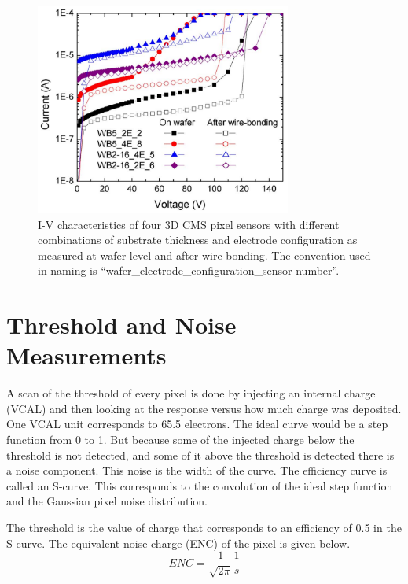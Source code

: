 \begin{figure}[htb!]
\begin{center}
\centerline{
\includegraphics[width=0.75\textwidth]{3D/IV_ba.pdf}
}
\caption{I-V characteristics of four 3D CMS pixel sensors with different combinations of substrate thickness and electrode configuration as measured at wafer level and after wire-bonding. The convention used in naming is “wafer\_electrode\_configuration\_sensor number”.~\cite{5734879} }
\label{fig:IV_ba}
\end{center}
\end{figure}


\section{Threshold and Noise Measurements}

A scan of the threshold of every pixel is done by injecting an internal charge (VCAL) and then looking at the response versus how much charge was deposited. One VCAL unit corresponds to 65.5 electrons. The ideal curve would be a step function from 0 to 1. But because some of the injected charge below the threshold is not detected, and some of it above the threshold is detected there is a noise component. This noise is the width of the curve.  The efficiency curve is called an S-curve.  This corresponds to the convolution of the ideal step function and the Gaussian pixel noise distribution.

The threshold is the value of charge that corresponds to an efficiency of 0.5 in the S-curve.  The equivalent noise charge (ENC) of the pixel is given below.
\begin{equation} ENC = \dfrac{1}{\sqrt{2\pi}}\dfrac{1}{s} \end{equation}

